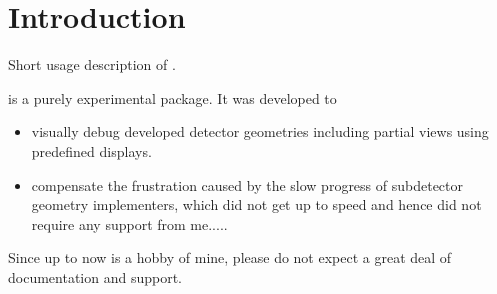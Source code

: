 \documentclass[10pt,a4paper]{article}
\begin{document}
\section{Introduction}
\label{sec:ddeve-user-manual-introduction}
\noindent
Short usage description of \DDE.

\noindent
\DDE is a purely experimental package. It was developed to 
\begin{itemize}
\item visually debug developed detector geometries including partial views 
       using predefined displays.
\item compensate the frustration caused by the slow progress of subdetector 
       geometry implementers, which did not get up to speed and hence did not
       require any support from me.....
\end{itemize}
Since up to now \DDE is a hobby of mine, please do not expect a great deal 
of documentation and support.

\end{document}
